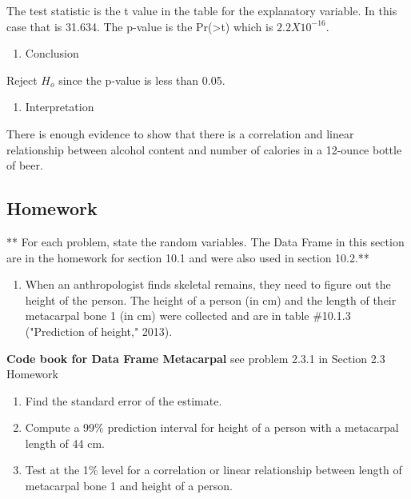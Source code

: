 \documentclass[
]{book}
\providecommand{\tightlist}{%
  \setlength{\itemsep}{0pt}\setlength{\parskip}{0pt}}
\begin{document}
The test statistic is the t value in the table for the explanatory variable. In this case that is 31.634. The p-value is the Pr(\textgreater\textbar t\textbar) which is \(2.2X10^{-16}\).

\begin{enumerate}
\def\labelenumi{\arabic{enumi}.}
\setcounter{enumi}{4}
\tightlist
\item
  Conclusion
\end{enumerate}

Reject \(H_o\) since the p-value is less than 0.05.

\begin{enumerate}
\def\labelenumi{\arabic{enumi}.}
\setcounter{enumi}{5}
\tightlist
\item
  Interpretation
\end{enumerate}

There is enough evidence to show that there is a correlation and linear relationship between alcohol content and number of calories in a 12-ounce bottle of beer.

\hypertarget{homework-2}{%
\subsection{Homework}\label{homework-2}}

** For each problem, state the random variables. The Data Frame in this section are in the homework for section 10.1 and were also used in section 10.2.**

\begin{enumerate}
\def\labelenumi{\arabic{enumi}.}
\tightlist
\item
  When an anthropologist finds skeletal remains, they need to figure out the height of the person. The height of a person (in cm) and the length of their metacarpal bone 1 (in cm) were collected and are in table \#10.1.3 ("Prediction of height," 2013).
\end{enumerate}

\textbf{Code book for Data Frame Metacarpal} see problem 2.3.1 in Section 2.3 Homework

\begin{enumerate}
\def\labelenumi{\alph{enumi}.}
\tightlist
\item
  Find the standard error of the estimate.
\item
  Compute a 99\% prediction interval for height of a person with a metacarpal length of 44 cm.
\item
  Test at the 1\% level for a correlation or linear relationship between length of metacarpal bone 1 and height of a person.
\end{enumerate}
\end{document}
